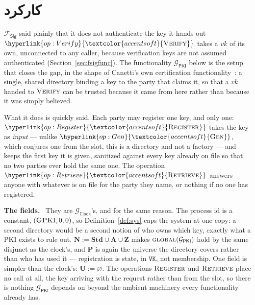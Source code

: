 \documentclass[10pt,oneside,openany]{book}
\newcommand{\Ps}{\mathbf{P}}
\renewcommand{\emptyset}{\varnothing}
\newcommand{\admits}{\mathbf{N}}
\newcommand{\Apid}{\mathbf{A}}
\newcommand{\Zpid}{\mathbf{Z}}
\newcommand{\Stdpid}{\mathbf{Std}}
\newcommand{\uses}{\mathbf{U}}
\newcommand{\op}[1]{\textnormal{\textsc{#1}}}
\newcommand{\opl}[1]{\hyperlink{op:#1}{\textcolor{accentsoft}{\op{#1}}}}
\newcommand{\Fsig}{\mathcal{F}_{\mathsf{Sig}}}
\newcommand{\Gclock}{\mathcal{G}_{\mathsf{Clock}}}
\newcommand{\Gpki}{\mathcal{G}_{\mathsf{PKI}}}
\newcommand{\vk}{\mathit{vk}}
\newcommand{\V}[1]{\mathtt{#1}}
\newcommand{\heading}[1]{\medskip\par\noindent\textcolor{accent}{\textbf{#1.}}\ }
\theoremstyle{accentdef}
\theoremstyle{accentplain}
\begin{document}
\section{کارکرد}\label{sec:pkifunc}

$\Fsig$ said plainly that it does not authenticate the key it hands out --- $\opl{Verify}$ takes a
$\vk$ of its own, unconnected to any caller, because verification keys are not assumed
authenticated (Section~\ref{sec:fsigfunc}). The functionality $\Gpki$ below is the setup that closes the gap, in the shape of
Canetti's own certification functionality~\cite{Canetti04}: a
single, shared directory binding a key to the party that claims it, so that a $\vk$ handed to
$\op{Verify}$ can be trusted because it came from here rather than because it was simply believed.

What it does is quickly said. Each party may register one key, and only one: $\opl{Register}$
takes the key as \emph{input} --- unlike $\opl{Gen}$, which conjures one from the slot, this is a
directory and not a factory --- and keeps the first key it is given, sanitized against every key
already on file so that no two parties ever hold the same one. The operation $\opl{Retrieve}$ answers anyone with
whatever is on file for the party they name, or nothing if no one has registered.

\heading{The fields} They are $\Gclock$'s, and for the same reason. The process id is a constant,
$(\op{G}\op{PKI},0,0)$, so Definition~\ref{def:sys} caps the system at one copy: a second
directory would be a second notion of who owns which key, exactly what a PKI exists to rule out.
$\admits := \Stdpid \cup \Apid \cup \Zpid$ makes $\op{global}(\Gpki)$ hold by the same disjunct as
the clock's, and $\Ps$ is again the universe the directory covers rather than who has used it ---
registration is state, in $\V{VK}$, not membership. One field is simpler than the clock's:
$\uses := \emptyset$. The operations $\op{Register}$ and $\op{Retrieve}$ place no call at all, the key arriving
with the request rather than from the slot, so there is nothing $\Gpki$ depends on beyond the
ambient machinery every functionality already has.
\end{document}
